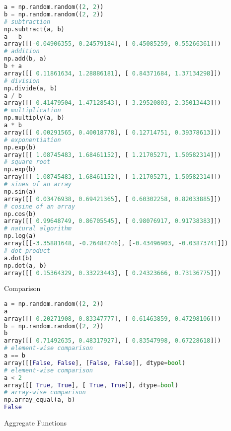 \begin{lstlisting}[language=Python]
a = np.random.random((2, 2))
b = np.random.random((2, 2))
# subtraction
np.subtract(a, b)
a - b
array([[-0.04906355, 0.24579184], [ 0.45085259, 0.55266361]])
# addition
np.add(b, a)
b + a
array([[ 0.11861634, 1.28886181], [ 0.84371684, 1.37134298]])
# division
np.divide(a, b)
a / b
array([[ 0.41479504, 1.47128543], [ 3.29520803, 2.35013443]])
# multiplication
np.multiply(a, b)
a * b
array([[ 0.00291565, 0.40018778], [ 0.12714751, 0.39378613]])
# exponentiation
np.exp(b)
array([[ 1.08745483, 1.68461152], [ 1.21705271, 1.50582314]])
# square root
np.exp(b)
array([[ 1.08745483, 1.68461152], [ 1.21705271, 1.50582314]])
# sines of an array
np.sin(a)
array([[ 0.03476938, 0.69421365], [ 0.60302258, 0.82033885]])
# cosine of an array
np.cos(b)
array([[ 0.99648749, 0.86705545], [ 0.98076917, 0.91738383]])
# natural algorithm
np.log(a)
array([[-3.35881648, -0.26484246], [-0.43496903, -0.03873741]])
# dot product
a.dot(b)
np.dot(a, b)
array([[ 0.15364329, 0.33223443], [ 0.24323666, 0.73136775]])
\end{lstlisting}

Comparison

\begin{lstlisting}[language=Python]
a = np.random.random((2, 2))
a
array([[ 0.20271908, 0.83347777], [ 0.61463859, 0.47298106]])
b = np.random.random((2, 2))
b
array([[ 0.71492635, 0.48317927], [ 0.83547998, 0.67228618]])
# element-wise comparison
a == b
array([[False, False], [False, False]], dtype=bool)
# element-wise comparison
a < 2
array([[ True, True], [ True, True]], dtype=bool)
# array-wise comparison
np.array_equal(a, b)
False
\end{lstlisting}

Aggregate Functions

